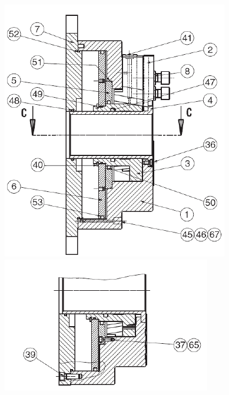 \begin{figure}[!h]
  \begin{minipage}{0.48\linewidth}
  \centering\includegraphics[width=.9\linewidth]{img/mandrin_dessin_1}
  \end{minipage}
  \hfill
  \begin{minipage}{0.48\linewidth}
  \centering\includegraphics[width=.9\linewidth]{img/mandrin_dessin_2}
 \end{minipage}
\end{figure}

\newpage

